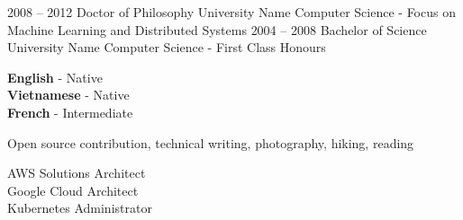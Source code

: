 \documentclass[9pt]{developercv} %
\begin{document}


\begin{entrylist}
	\entry
		{2008 -- 2012}
		{Doctor of Philosophy}
		{University Name}
		{Computer Science - Focus on Machine Learning and Distributed Systems}
	\entry
		{2004 -- 2008}
		{Bachelor of Science}
		{University Name}
		{Computer Science - First Class Honours}
\end{entrylist}


\begin{minipage}[t]{0.3\textwidth}
	\vspace{-\baselineskip} %

	
	\textbf{English} - Native\\
	\textbf{Vietnamese} - Native\\
	\textbf{French} - Intermediate
\end{minipage}
\hfill
\begin{minipage}[t]{0.3\textwidth}
	\vspace{-\baselineskip} %
	
	
	Open source contribution, technical writing, photography, hiking, reading
\end{minipage}
\hfill
\begin{minipage}[t]{0.3\textwidth}
	\vspace{-\baselineskip} %
	
	
	AWS Solutions Architect\\
	Google Cloud Architect\\
	Kubernetes Administrator
\end{minipage}

\end{document}
